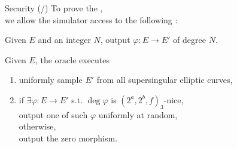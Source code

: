 \begin{frame}{Security (/\securitytotal{})}
    To prove the ,\\
    we allow the simulator access to the following :

    \begin{oracle}\label{oracle:fidio}
        Given $E$ and an integer $N$, output $\varphi: E \to E'$ of degree $N$.
    \end{oracle}

    \vspace{5pt}
    \begin{oracle}\label{oracle:rundio}
        Given $E$, the oracle executes
        \begin{enumerate}
            \item uniformly sample $E'$ from all supersingular elliptic curves,
            \item if $\exists\varphi: E \to E'$ s.t. $\deg\varphi$ is $(2^a, 2^b, f)_3$-nice,\\
                \quad output one of such $\varphi$ uniformly at random,\\
                otherwise,\\
                \quad output the zero morphism.
        \end{enumerate}
    \end{oracle}
\end{frame}

